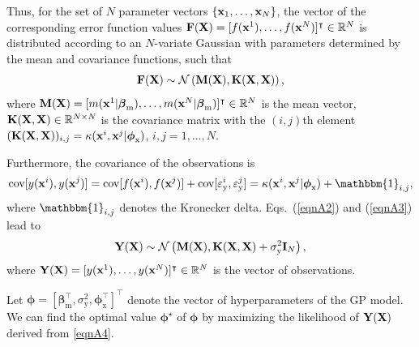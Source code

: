 \documentclass[journal ]{new-aiaa}
\newcommand{\edit}[1]{\textcolor{red}{#1}} %
\begin{document}
Thus, for the set of $N$ parameter vectors $\{{\bf x}_1,\dots,\textbf{x}_N \}$, the vector of the corresponding error function values ${\bf F}({\bf X})=[f({\bf x}^1),\dots,f({\bf x}^N)]^\intercal \in \mathbb{R}^N$ is distributed according to %
{an $N$-variate Gaussian with parameters determined by the mean
and covariance functions, such that}
\begin{equation}\label{eqnA2}
	{\bf F}({\bf X}) \sim \mathcal{N} \left({\bf M}({\bf X}),{\bf K}({\bf X},{\bf X})\right),
\end{equation}
where ${\bf M}({\bf X})=[m({\bf x}^1|\boldsymbol \beta_{\text{m}}),\dots,m({\bf x}^N|\boldsymbol \beta_{\text{m}})]^\intercal \in \mathbb{R}^N$ is the mean vector, ${\bf K}({\bf X},{\bf X}) \in \mathbb{R}^{N \times N}$ is the covariance matrix with the $(i,j)$th element $({\bf K}({\bf X},{\bf X}))_{i,j} = \kappa({\bf x}^i,{\bf x}^j|\boldsymbol \phi_{\text{x}})$, $i,j=1,\dots,N$.

Furthermore, the covariance of the observations is
\begin{equation}\label{eqnA3}
		\text{cov}[y({\bf x}^i),y({\bf x}^j)]  = \text{cov}[f({\bf x}^i),f({\bf x}^j)] + \text{cov}[\varepsilon_\text{y}^i,\varepsilon_\text{y}^j]
		 = \kappa({\bf x}^i,{\bf x}^j|\boldsymbol \phi_{\text{x}}) + \mathbbm{1}_{i,j},
\end{equation}
where $\mathbbm{1}_{i,j}$ denotes the Kronecker delta. Eqs.~(\ref{eqnA2}) and (\ref{eqnA3}) lead to
\begin{equation}\label{eqnA4}
	{\bf Y}({\bf X}) \sim \mathcal{N} \left({\bf M}({\bf X}),{\bf K}({\bf X},{\bf X})+\sigma^2_\text{y} {\bf I}_N\right),
\end{equation}
where ${\bf Y}({\bf X})=[y({\bf x}^1),\dots,y({\bf x}^N)]^\intercal \in \mathbb{R}^N$ is the vector of observations.

Let ${\boldsymbol \phi} = [\boldsymbol \beta_{\text{m}}^\intercal,\sigma^2_\text{y},\boldsymbol \phi_{\text{x}}^\intercal]^\intercal$ denote the vector of hyperparameters of the GP model.
We can find the optimal value ${\boldsymbol \phi^\star}$ of ${\boldsymbol \phi}$ by maximizing the likelihood of ${\bf Y}({\bf X})$ derived from \cref{eqnA4}.
\end{document}
